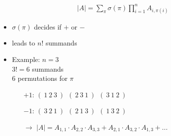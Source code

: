 \documentclass[a4]{scrartcl}
\begin{document}
\begin{align*}
\\
|A| = \sum_{\pi} \sigma(\pi) \prod^{n}_{i=1} A_{i, \pi(i)}
\end{align*}
\begin{itemize}
\item $\sigma(\pi)$ decides if $+$ or $-$
\item leads to $n!$ summands
\item Example: $n= 3$ \\
$3! = 6$ summands \\
$6$ permutations for $\pi$ 
\begin{itemize}
\item[$+1$: ] $( \ 1 \ 2 \ 3 \ ) \ \ ( \ 2 \ 3 \ 1 \ ) \ \  ( \ 3 \ 1 \ 2 \ ) $
\item[$-1$: ] $( \ 3 \ 2 \ 1 \ ) \ \ ( \ 2 \ 1 \ 3 \ ) \ \  ( \ 1 \ 3 \ 2 \ ) $
\item[$\rightarrow$] $|A| = A_{1,1} \cdot A_{2,2} \cdot A_{3,3} + A_{2,1} \cdot A_{3,2} \cdot A_{1,3} + ...$
\end{itemize}
\end{itemize}
\end{document}
